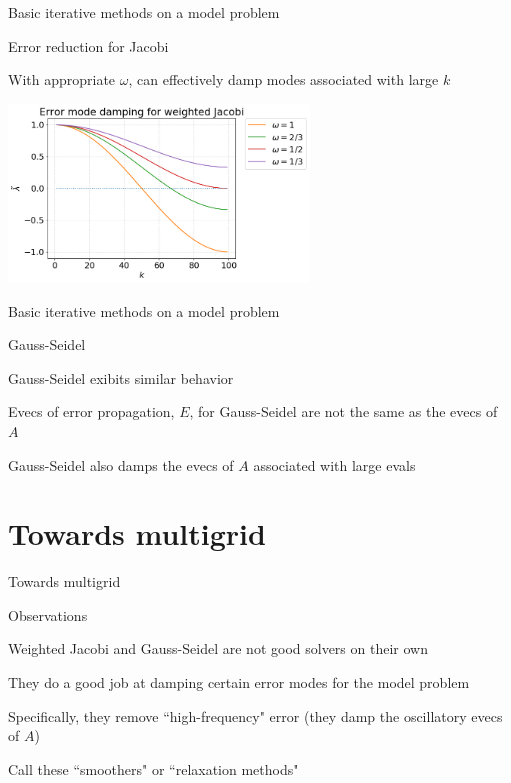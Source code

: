 \documentclass[18pt,xcolor=table]{beamer}
\begin{document}
\begin{frame}{Basic iterative methods on a model problem}
\begin{center}
\begin{block}{Error reduction for Jacobi}
\bit
\item With appropriate $\omega$, can effectively damp modes associated with large $k$
\eit
\end{block}
\includegraphics[width=0.6\textwidth]{../figures/weightedJacobiModeDamping}
\end{center}
\end{frame}

\begin{frame}{Basic iterative methods on a model problem}
\begin{block}{Gauss-Seidel}
\bit
\item Gauss-Seidel exibits similar behavior
\item Evecs of error propagation, $E$, for Gauss-Seidel are not the same as the evecs of $A$
\item Gauss-Seidel also damps the evecs of $A$ associated with large evals
\eit
\end{block}
\end{frame}


\section{Towards multigrid}

\begin{frame}{Towards multigrid}
\begin{block}{Observations}
\bit
\item Weighted Jacobi and Gauss-Seidel are not good solvers on their own
\item They do a good job at damping certain error modes for the model problem
\item Specifically, they remove ``high-frequency" error (they damp the oscillatory evecs of $A$)
\item Call these ``smoothers" or ``relaxation methods"
\eit
\end{block}
\end{frame}
\end{document}
